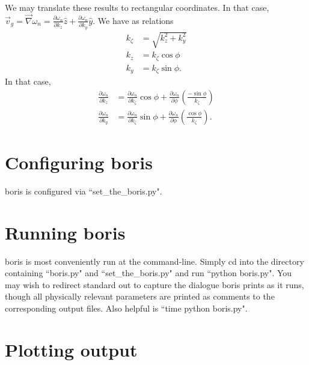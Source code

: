 \documentclass{article}
\begin{document}
We may translate these results to rectangular coordinates. In that case, $\vec{v}_{g} = \vec{\nabla} \omega_{n} = \frac{\partial \omega_{n}}{\partial k_{z}} \hat{z} + \frac{\partial \omega_{n}}{\partial k_{y}} \hat{y}$. We have as relations
\begin{align}
k_{\zeta} &= \sqrt{k_{z}^2 + k_{y}^2} \\
k_{z} &= k_{\zeta} \cos{\phi} \\
k_{y} &= k_{\zeta} \sin{\phi}.
\end{align}
In that case,
\begin{align}
\frac{\partial \omega_{n}}{\partial k_{z}} &= \frac{\partial \omega_{n}}{\partial k_{\zeta}} \cos{\phi} + \frac{\partial \omega_{n}}{\partial \phi} \left(\frac{-\sin{\phi}}{k_{\zeta}}\right) \\
\frac{\partial \omega_{n}}{\partial k_{y}} &= \frac{\partial \omega_{n}}{\partial k_{\zeta}} \sin{\phi} + \frac{\partial \omega_{n}}{\partial \phi} \left(\frac{\cos{\phi}}{k_{\zeta}}\right).
\end{align}

\section{Configuring boris}
boris is configured via ``set\_{}the\_{}boris.py".
\section{Running boris}
boris is most conveniently run at the command-line. 
Simply cd into the directory containing ``boris.py" and ``set\_{}the\_{}boris.py" and run ``python boris.py". 
You may wish to redirect standard out to capture the dialogue boris prints as it runs, though all physically relevant parameters are printed as comments to the corresponding output files. 
Also helpful is ``time python boris.py".
\section{Plotting output}
\end{document}

